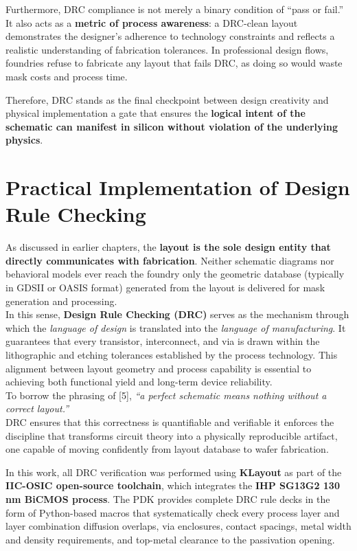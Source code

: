 \documentclass[
  11pt,
  a4paper,
  oneside]{scrbook}
\begin{document}
Furthermore, DRC compliance is not merely a binary condition of ``pass
or fail.'' It also acts as a \textbf{metric of process awareness}: a
DRC-clean layout demonstrates the designer's adherence to technology
constraints and reflects a realistic understanding of fabrication
tolerances. In professional design flows, foundries refuse to fabricate
any layout that fails DRC, as doing so would waste mask costs and
process time.

Therefore, DRC stands as the final checkpoint between design creativity
and physical implementation a gate that ensures the \textbf{logical
intent of the schematic can manifest in silicon without violation of the
underlying physics}.

\section{Practical Implementation of Design Rule
Checking}\label{practical-implementation-of-design-rule-checking}

As discussed in earlier chapters, the \textbf{layout is the sole design
entity that directly communicates with fabrication}. Neither schematic
diagrams nor behavioral models ever reach the foundry only the geometric
database (typically in GDSII or OASIS format) generated from the layout
is delivered for mask generation and processing.\\
In this sense, \textbf{Design Rule Checking (DRC)} serves as the
mechanism through which the \emph{language of design} is translated into
the \emph{language of manufacturing}. It guarantees that every
transistor, interconnect, and via is drawn within the lithographic and
etching tolerances established by the process technology. This alignment
between layout geometry and process capability is essential to achieving
both functional yield and long-term device reliability.\\
To borrow the phrasing of {[}5{]}, \emph{``a perfect schematic means
nothing without a correct layout.''}\\
DRC ensures that this correctness is quantifiable and verifiable it
enforces the discipline that transforms circuit theory into a physically
reproducible artifact, one capable of moving confidently from layout
database to wafer fabrication.

In this work, all DRC verification was performed using \textbf{KLayout}
as part of the \textbf{IIC-OSIC open-source toolchain}, which integrates
the \textbf{IHP SG13G2 130 nm BiCMOS process}. The PDK provides complete
DRC rule decks in the form of Python-based macros that systematically
check every process layer and layer combination diffusion overlaps, via
enclosures, contact spacings, metal width and density requirements, and
top-metal clearance to the passivation opening.
\end{document}
